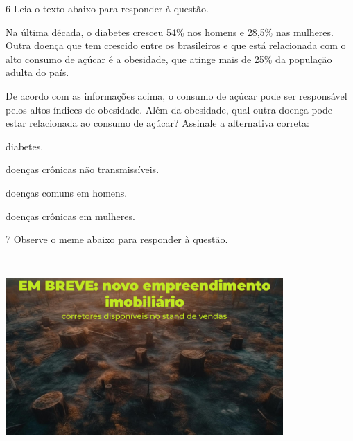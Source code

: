 \num{6} Leia o texto abaixo para responder à questão. 

\begin{myquote}

Na última década, o diabetes cresceu 54\% nos homens e 28,5\% nas
mulheres. Outra doença que tem crescido entre os brasileiros e que está
relacionada com o alto consumo de açúcar é a obesidade, que atinge
mais de 25\% da população adulta do país.


\end{myquote}


De acordo com as informações acima, o consumo de açúcar pode ser
responsável pelos altos índices de obesidade. Além da obesidade, qual
outra doença pode estar relacionada ao consumo de açúcar? Assinale a
alternativa correta:

\begin{escolha}

  \item diabetes.
  
  \item doenças crônicas não transmissíveis.
  
  \item doenças comuns em homens.
  
  \item doenças crônicas em mulheres. 

\end{escolha}

\num{7} Observe o meme abaixo para responder à questão.

\includegraphics[width=4.16667in,height=3.03125in]{imgSAEB_7_POR/media/image21.png}

